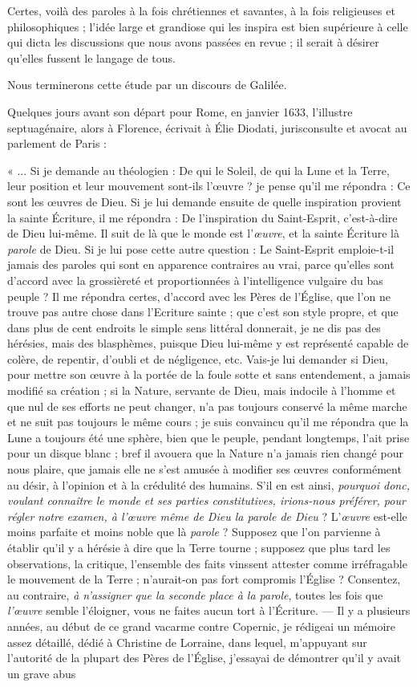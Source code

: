 \documentclass[a4paper, 11pt, oneside, landscape]{article}
\begin{document}
Certes, voilà des paroles à la fois chrétiennes et savantes, à la fois religieuses et philosophiques ; l'idée large et grandiose qui les inspira est bien supérieure à celle qui dicta les discussions que nous avons passées en revue ; il serait à désirer qu'elles fussent le langage de tous.

Nous terminerons cette étude par un discours de Galilée.

Quelques jours avant son départ pour Rome, en janvier 1633, l'illustre septuagénaire, alors à Florence, écrivait à Élie Diodati, jurisconsulte et avocat au parlement de Paris :

« ... Si je demande au théologien : De qui le Soleil, de qui la Lune et la Terre, leur position et leur mouvement sont-ils l'œuvre ? je pense qu'il me répondra : Ce sont les œuvres de Dieu. Si je lui demande ensuite de quelle inspiration provient la sainte Écriture, il me répondra : De l'inspiration du Saint-Esprit, c'est-à-dire de Dieu lui-même. Il suit de là que le monde est l'\emph{œuvre}, et la sainte Écriture là \emph{parole} de Dieu. Si je lui pose cette autre question : Le Saint-Esprit emploie-t-il jamais des paroles qui sont en apparence contraires au vrai, parce qu'elles sont d'accord avec la grossièreté et proportionnées à l'intelligence vulgaire du bas peuple ? Il me répondra certes, d'accord avec les Pères de l'Église, que l'on ne trouve pas autre chose dans l'Ecriture sainte ; que c'est son style propre, et que dans plus de cent endroits le simple sens littéral donnerait, je ne dis pas des hérésies, mais des blasphèmes, puisque Dieu lui-même y est représenté capable de colère, de repentir, d'oubli et de négligence, etc. Vais-je lui demander si Dieu, pour mettre son œuvre à la portée de la foule sotte et sans entendement, a jamais modifié sa création ; si la Nature, servante de Dieu, mais indocile à l'homme et que nul de ses efforts ne peut changer, n'a pas toujours conservé la même marche et ne suit pas toujours le même cours ; je suis convaincu qu'il me répondra que la Lune a toujours été une sphère, bien que le peuple, pendant longtemps, l'ait prise pour un disque blanc ; bref il avouera que la Nature n'a jamais rien changé pour nous plaire, que jamais elle ne s'est amusée à modifier ses œuvres conformément au désir, à l'opinion et à la crédulité des humains. S'il en est ainsi, \emph{pourquoi donc, voulant connaître le monde et ses parties constitutives, irions-nous préférer, pour régler notre examen, à l'œuvre même de Dieu la parole de Dieu} ? L'\emph{œuvre} est-elle moins parfaite et moins noble que là \emph{parole} ? Supposez que l'on parvienne à établir qu'il y a hérésie à dire que la Terre tourne ; supposez que plus tard les observations, la critique, l'ensemble des faits vinssent attester comme irréfragable le mouvement de la Terre ; n'aurait-on pas fort compromis l'Église ? Consentez, au contraire, \emph{à n'assigner que la seconde place à la parole}, toutes les fois que \emph{l'œuvre} semble l'éloigner, vous ne faites aucun tort à l'Écriture. --- Il y a plusieurs années, au début de ce grand vacarme contre Copernic, je rédigeai un mémoire assez détaillé, dédié à Christine de Lorraine, dans lequel, m'appuyant sur l'autorité de la plupart des Pères de l'Église, j'essayai de démontrer qu'il y avait un grave abus 
\end{document}

